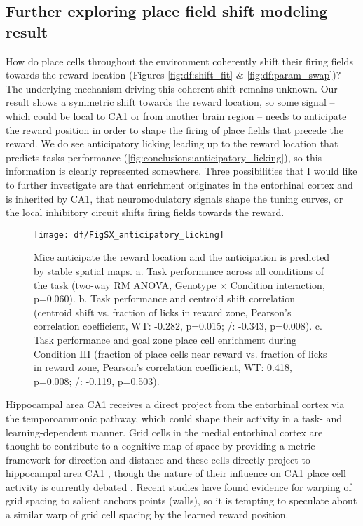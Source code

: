 \subsection{Further exploring place field shift modeling result}
How do place cells throughout the environment coherently shift their firing fields towards the reward location (Figures \ref{fig:df:shift_fit} \& \ref{fig:df:param_swap})?
The underlying mechanism driving this coherent shift remains unknown.
Our result shows a symmetric shift towards the reward location, so some signal -- which could be local to CA1 or from another brain region -- needs to anticipate the reward position in order to shape the firing of place fields that precede the reward.
We do see anticipatory licking leading up to the reward location that predicts tasks performance (\autoref{fig:conclusions:anticipatory_licking}), so this information is clearly represented somewhere.
Three possibilities that I would like to further investigate are that enrichment originates in the entorhinal cortex and is inherited by CA1, that neuromodulatory signals shape the tuning curves, or the local inhibitory circuit shifts firing fields towards the reward.
\begin{figure}
	\centering
	\texttt{[image: df/FigSX\_anticipatory\_licking]}
	\caption[Mice anticipate the reward location and the anticipation is predicted by stable spatial maps]{Mice anticipate the reward location and the anticipation is predicted by stable spatial maps. a. Task performance across all conditions of the task (two-way RM ANOVA, Genotype $\times$ Condition interaction, p=0.060).
	b. Task performance and centroid shift correlation (centroid shift vs. fraction of licks in reward zone, Pearson's correlation coefficient, WT: -0.282, p=0.015; \df/: -0.343, p=0.008).
	c. Task performance and goal zone place cell enrichment during Condition III (fraction of place cells near reward vs. fraction of licks in reward zone, Pearson's correlation coefficient, WT: 0.418, p=0.008; \df/: -0.119, p=0.503).}
	\label{fig:conclusions:anticipatory_licking}
\end{figure}
Hippocampal area CA1 receives a direct project from the entorhinal cortex via the temporoammonic pathway, which could shape their activity in a task- and learning-dependent manner. Grid cells in the medial entorhinal cortex are thought to contribute to a cognitive map of space by providing a metric framework for direction and distance \citep{Hafting2005, Jeffery2015a} and these cells directly project to hippocampal area CA1 \citep{Zhang2013}, though the nature of their influence on CA1 place cell activity is currently debated \citep{Wills2010, Langston2010, Koenig2011, Brandon2011a}. Recent studies \citep{Krupic2015a, Stensola2015a} have found evidence for warping of grid spacing to salient anchors points (walls), so it is tempting to speculate about a similar warp of grid cell spacing by the learned reward position.
